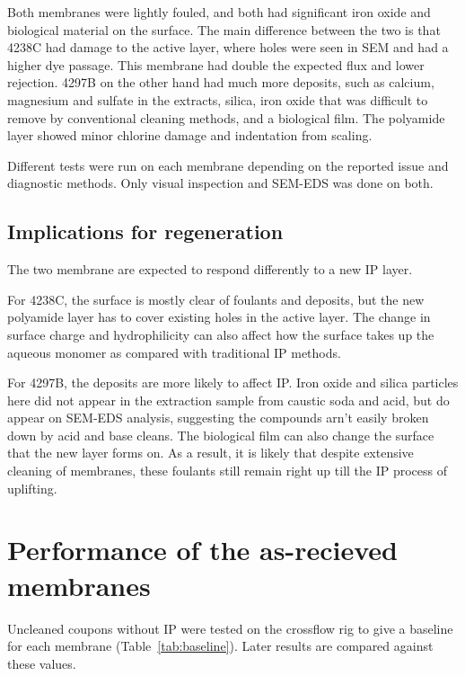 Both membranes were lightly fouled, and both had significant iron oxide and biological material on the surface. The main difference between the two is that 4238C had damage to the active layer, where holes were seen in SEM and had a higher dye passage. This membrane had double the expected flux and lower rejection. 4297B on the other hand had much more deposits, such as calcium, magnesium and sulfate in the extracts, silica, iron oxide that was difficult to remove by conventional cleaning methods, and a biological film. The polyamide layer showed minor chlorine damage and indentation from scaling. 

Different tests were run on each membrane depending on the reported issue and diagnostic methods. Only visual inspection and SEM-EDS was done on both. 

\subsection{Implications for regeneration}

The two membrane are expected to respond differently to a new IP layer. 

For 4238C, the surface is mostly clear of foulants and deposits, but the new polyamide layer has to cover existing holes in the active layer. The change in surface charge and hydrophilicity can also affect how the surface takes up the aqueous monomer as compared with traditional IP methods.

For 4297B, the deposits are more likely to affect IP. Iron oxide and silica particles here did not appear in the extraction sample from caustic soda and acid, but do appear on SEM-EDS analysis, suggesting the compounds arn't easily broken down by acid and base cleans. The biological film can also change the surface that the new layer forms on. As a result, it is likely that despite extensive cleaning of membranes, these foulants still remain right up till the IP process of uplifting.

\section{Performance of the as-recieved membranes}
\label{sec:res-baseline}
Uncleaned coupons without IP were tested on the crossflow rig to give a baseline for each membrane (Table~\ref{tab:baseline}). Later results are compared against these values.

